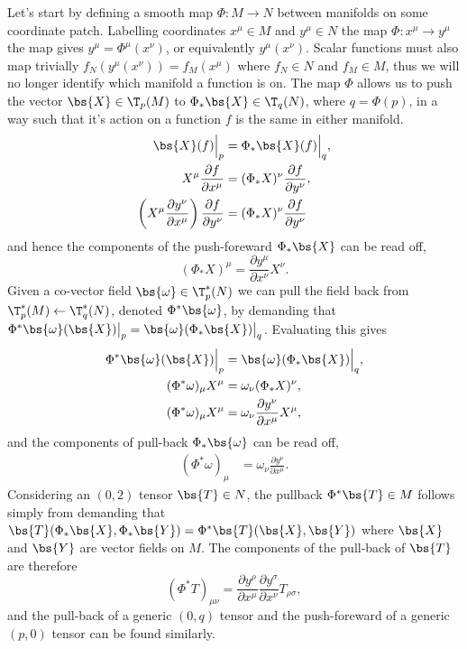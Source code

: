 Let's start by defining a smooth map $\Phi : M \rightarrow N$ between manifolds on some coordinate patch. Labelling coordinates $x^\mu\in M$ and $y^\mu\in N$ the map $\Phi:x^\mu \rightarrow y^\mu$ the map gives $y^\mu = \Phi^\mu(x^\nu)$, or equivalently $y^\mu(x^\nu)$. Scalar functions must also map trivially $f_N(y^\mu(x^\nu))=f_M(x^\mu)$ where $f_N\in N$ and $f_M \in M$, thus we will no longer identify which manifold a function is on. The map $\Phi$ allows us to push the vector $\bs{X}\in\T_p(M)$ to $\Phi_* \bs{X} \in \T_q(N)$, where $q=\Phi(p)$, in a way such that it's action on a function $f$ is the same in either manifold. 
\begin{align}
\bs{X}(f)\Big|_p &= \Phi_*\bs{X}(f)\Big|_q ,\\
X^\mu \frac{\partial f}{\partial x^\mu}  &= (\Phi_* X)^\nu\frac{\partial f}{\partial y^\nu} , \\
\left( X^\mu \frac{\partial y^\nu}{\partial x^\mu}\right) \frac{\partial f}{\partial y^\nu}  &= (\Phi_* X)^\nu\frac{\partial f}{\partial y^\nu}
\end{align} 
and hence the components of the push-foreward $\Phi_* \bs{X}$ can be read off,
\begin{equation}
(\Phi_* X)^\mu = \frac{\partial y^\mu}{\partial x^\nu}X^\nu.
\end{equation}
Given a co-vector field $\bs{\omega} \in \T^*_p(N)$ we can pull the field back from $\T^*_p(M) \leftarrow \T^*_q(N)$, denoted $\Phi^*\bs{\omega}$, by demanding that $\Phi^*\bs{\omega}(\bs{X})\big|_p = \bs{\omega}(\Phi_* \bs{X})\big|_q$. Evaluating this gives 
\begin{align}
\Phi^*\bs{\omega}(\bs{X})\Big|_p &= \bs{\omega}(\Phi_* \bs{X})\Big|_q, \\
(\Phi^* \omega)_\mu X^\mu&= \omega_\nu (\Phi_*X)^\nu , \\ 
(\Phi^* \omega)_\mu X^\mu&= \omega_\nu \frac{\partial y^\nu}{\partial x^\mu} X^\mu ,
\end{align}
and the components of pull-back $\Phi_*\bs{\omega}$ can be read off,
\begin{align}
(\Phi^* \omega)_\mu &= \omega_\nu \frac{\partial y^\nu}{\partial x^\mu}.
\end{align}
Considering an $(0,2)$ tensor $\bs{T} \in N$, the pullback $\Phi^*\bs{T} \in M$ follows simply from demanding that $\bs{T}(\Phi_* \bs{X},\Phi_*\bs{Y}) = \Phi^*\bs{T}(\bs{X},\bs{Y})$ where $\bs{X}$ and $\bs{Y}$ are vector fields on $M$. The components of the pull-back of $\bs{T}$ are therefore
\begin{equation}
(\Phi^*T)_{\mu\nu} = \frac{\partial y^\rho}{\partial x^\mu} \frac{\partial y^\sigma}{\partial x^\nu}T_{\rho\sigma},
\end{equation}
and the pull-back of a generic $(0,q)$ tensor and the push-foreward of a generic $(p,0)$ tensor can be found similarly.

